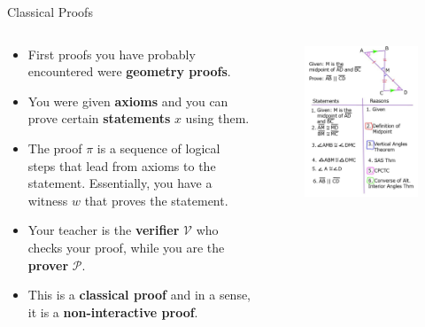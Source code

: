 \documentclass{zkdl-presentation-template}
\begin{document}
    \begin{frame}{Classical Proofs}
        \begin{columns}
            \begin{column}{0.6\textwidth}
                \begin{itemize}
                    \item First proofs you have probably encountered were \textbf{geometry proofs}. 
                    \item You were given \textbf{axioms} and you can prove certain \textbf{statements} $x$ using them.
                    \item The proof $\pi$ is a sequence of logical steps that lead from axioms to the statement. Essentially, you have a witness $w$ that proves the statement.
                    \item Your teacher is the \textbf{verifier} $\mathcal{V}$ who checks your proof, while you are the \textbf{prover} $\mathcal{P}$.
                    \item This is a \textbf{classical proof} and in a sense, it is a \textbf{non-interactive proof}.
                \end{itemize}
            \end{column}
            \begin{column}{0.4\textwidth}
                \begin{figure}
                \centering
                    \includegraphics[width=1.0\textwidth]{images/lecture_6/geometry-proof.jpg}

\end{figure}
\end{column}
\end{columns}
\end{frame}
\end{document}
